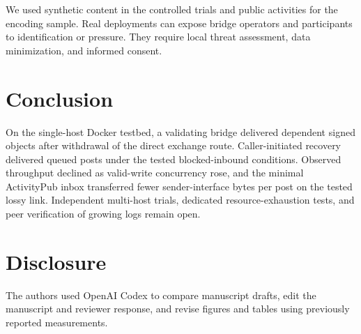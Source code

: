 \documentclass[conference,a4paper,10pt]{IEEEtran}
\begin{document}
We used synthetic content in the controlled trials and public activities for the encoding sample. Real deployments can expose bridge operators and participants to identification or pressure. They require local threat assessment, data minimization, and informed consent.

\section{Conclusion}

On the single-host Docker testbed, a validating bridge delivered dependent signed objects after withdrawal of the direct exchange route. Caller-initiated recovery delivered queued posts under the tested blocked-inbound conditions. Observed throughput declined as valid-write concurrency rose, and the minimal ActivityPub inbox transferred fewer sender-interface bytes per post on the tested lossy link. Independent multi-host trials, dedicated resource-exhaustion tests, and peer verification of growing logs remain open.

\section*{Disclosure}
The authors used OpenAI Codex to compare manuscript drafts, edit the manuscript and reviewer response, and revise figures and tables using previously reported measurements.



\end{document}
